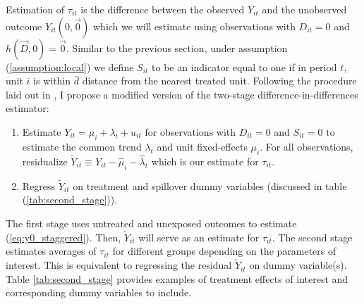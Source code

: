 \documentclass[11pt]{article}
\begin{document}
Estimation of $\tau_{it}$ is the difference between the observed $Y_{it}$ and the unobserved outcome $Y_{it}(0, \vec{0})$ which we will estimate using observations with $D_{it} = 0$ and $h(\vec{D}, 0) = \vec{0}$. Similar to the previous section, under assumption (\ref{assumption:local}) we define $S_{it}$ to be an indicator equal to one if in period $t$, unit $i$ is within $\bar{d}$ distance from the nearest treated unit. Following the procedure laid out in \citet{Gardner_2021}, I propose a modified version of the two-stage difference-in-differences estimator: 

\begin{enumerate}
    \item Estimate $Y_{it} = \mu_i + \lambda_t + u_{it}$ for observations with $D_{it} = 0$ and $S_{it} = 0$ to estimate the common trend $\lambda_t$ and unit fixed-effects $\mu_i$. For all observations, residualize $\tilde{Y}_{it} \equiv Y_{it} - \hat{\mu}_i - \hat{\lambda}_t$ which is our estimate for $\tau_{it}$.
    
    \item Regress $\tilde{Y}_{it}$ on treatment and spillover dummy variables (discussed in table (\ref{tab:second_stage})).
\end{enumerate}

The first stage uses untreated and unexposed outcomes to estimate (\ref{eq:y0_staggered}). Then, $\tilde{Y}_{it}$ will serve as an estimate for $\tau_{it}$. The second stage estimates averages of $\tau_{it}$ for different groups depending on the parameters of interest. This is equivalent to regressing the residual $\tilde{Y}_{it}$ on dummy variable(s). Table \ref{tab:second_stage} provides examples of treatment effects of interest and corresponding dummy variables to include. 
\end{document}

